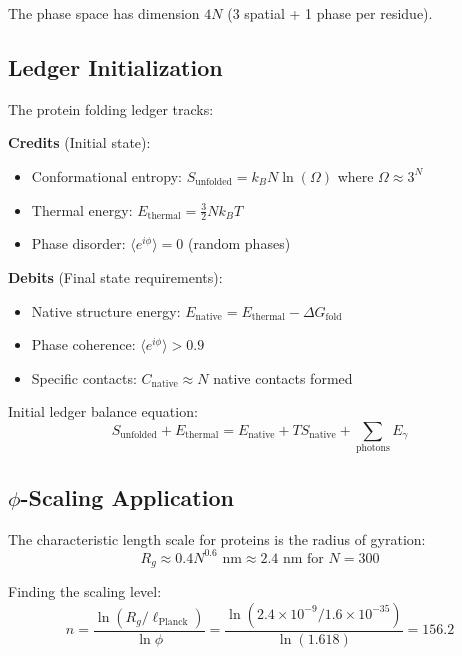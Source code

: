 \documentclass[12pt,a4paper]{article}
\begin{document}
{{The phase space has dimension $4N$ (3 spatial + 1 phase per residue).

\subsection{Ledger Initialization}

The protein folding ledger tracks:

\textbf{Credits} (Initial state):
\begin{itemize}
\item Conformational entropy: $S_{\text{unfolded}} = k_B N \ln(\Omega)$ where $\Omega \approx 3^N$
\item Thermal energy: $E_{\text{thermal}} = \frac{3}{2} N k_B T$
\item Phase disorder: $\langle e^{i\phi} \rangle = 0$ (random phases)
\end{itemize}

\textbf{Debits} (Final state requirements):
\begin{itemize}
\item Native structure energy: $E_{\text{native}} = E_{\text{thermal}} - \Delta G_{\text{fold}}$
\item Phase coherence: $\langle e^{i\phi} \rangle > 0.9$
\item Specific contacts: $C_{\text{native}} \approx N$ native contacts formed
\end{itemize}

Initial ledger balance equation:
\begin{equation}
S_{\text{unfolded}} + E_{\text{thermal}} = E_{\text{native}} + T S_{\text{native}} + \sum_{\text{photons}} E_{\gamma}
\end{equation}

\subsection{$\phi$-Scaling Application}

The characteristic length scale for proteins is the radius of gyration:
\begin{equation}
R_g \approx 0.4 N^{0.6} \text{ nm} \approx 2.4 \text{ nm for } N = 300
\end{equation}

Finding the scaling level:
\begin{equation}
n = \frac{\ln(R_g/\ell_{\text{Planck}})}{\ln \phi} = \frac{\ln(2.4 \times 10^{-9} / 1.6 \times 10^{-35})}{\ln(1.618)} = 156.2
\end{equation}

}}
\end{document}
